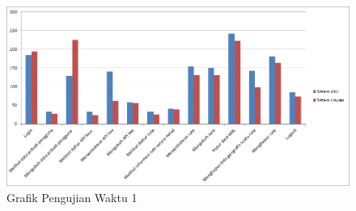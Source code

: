 
\begin{figure}[htbp]
	\centering
		\includegraphics[scale=0.6]{Gambar/5_pengujianwaktu_1.png}
	\caption{Grafik Pengujian Waktu 1} 
	\label{fig:5_pengujianwaktu_1}
\end{figure}

